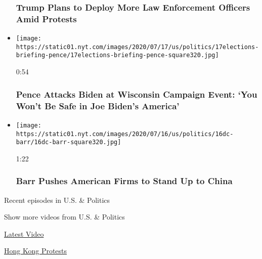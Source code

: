 \begin{itemize}
{  \subsubsection{Trump Plans to Deploy More Law Enforcement Officers
  Amid
  Protests}\label{trump-plans-to-deploy-more-law-enforcement-officers-amid-protests}}
\item
  \href{https://www.nytimes.com/video/us/100000007244976/pence-calls-out-biden-wisconsin.html?action=click\&module=video-series-bar\&region=header\&pgtype=Article\&playlistId=video/us-politics}{}

  \texttt{[image: https://static01.nyt.com/images/2020/07/17/us/politics/17elections-briefing-pence/17elections-briefing-pence-square320.jpg]}

  0:54

  \hypertarget{pence-attacks-biden-at-wisconsin-campaign-event-you-wont-be-safe-in-joe-bidens-america}{%
  \subsubsection{Pence Attacks Biden at Wisconsin Campaign Event: `You
  Won't Be Safe in Joe Biden's
  America'}\label{pence-attacks-biden-at-wisconsin-campaign-event-you-wont-be-safe-in-joe-bidens-america}}
\item
  \href{https://www.nytimes.com/video/us/elections/100000007242467/barr-china-companies-economy.html?action=click\&module=video-series-bar\&region=header\&pgtype=Article\&playlistId=video/us-politics}{}

  \texttt{[image: https://static01.nyt.com/images/2020/07/16/us/politics/16dc-barr/16dc-barr-square320.jpg]}

  1:22

  \hypertarget{barr-pushes-american-firms-to-stand-up-to-china}{%
  \subsubsection{Barr Pushes American Firms to Stand Up to
  China}\label{barr-pushes-american-firms-to-stand-up-to-china}}
\end{itemize}

Recent episodes in U.S. \& Politics

Show more videos from U.S. \& Politics

\href{/video}{}

\href{/video/latest-video}{Latest Video}

\href{/video/hk-protest}{Hong Kong Protests}

